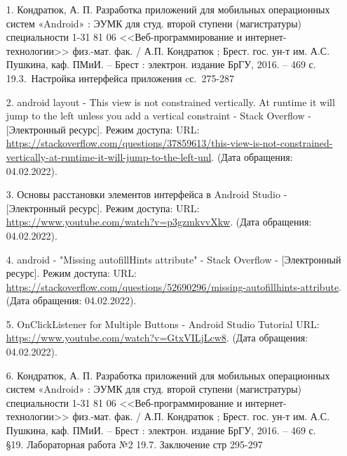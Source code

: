 \documentclass[12pt, a4paper, simple]{eskdtext}
\begin{document}
    \begin{enumerate}
        \item[1.] Кондратюк, А. П.
        Разработка приложений для мобильных операционных систем «Android» : ЭУМК для
        студ. второй ступени (магистратуры) специальности 1-31 81 06 <<Веб-программирование и интернет-технологии>>
        физ.-мат. фак. / А.П. Кондратюк ; Брест. гос. ун-т им. А.С. Пушкина, каф. ПМиИ. – Брест : электрон. издание БрГУ, 2016. – 469 с.\\
        19.3.~Настройка интерфейса приложения cс.~275-287

        \item[2.] android layout - This view is not constrained vertically. At runtime it will jump to the left unless you add a vertical constraint - Stack Overflow
        - [Электронный ресурс]. Режим доступа:
        URL: \url{https://stackoverflow.com/questions/37859613/this-view-is-not-constrained-vertically-at-runtime-it-will-jump-to-the-left-unl}.
        (Дата обращения: 04.02.2022).
        
        \item[3.] Основы расстановки элементов интерфейса в Android Studio
        - [Электронный ресурс]. Режим доступа:
        URL: \url{https://www.youtube.com/watch?v=p3gzmkvvXkw}.
        (Дата обращения: 04.02.2022).
        
        \item[4.] android - "Missing autofillHints attribute" - Stack Overflow
        - [Электронный ресурс]. Режим доступа:
        URL: \url{https://stackoverflow.com/questions/52690296/missing-autofillhints-attribute}.
        (Дата обращения: 04.02.2022).
        
        \item[5.] OnClickListener for Multiple Buttons - Android Studio Tutorial
        URL: \url{https://www.youtube.com/watch?v=GtxVILjLcw8}.
        (Дата обращения: 04.02.2022).
        
        \item[6.] Кондратюк, А. П.
        Разработка приложений для мобильных операционных систем «Android» : ЭУМК для
        студ. второй ступени (магистратуры) специальности 1-31 81 06 <<Веб-программирование и интернет-технологии>>
        физ.-мат. фак. / А.П. Кондратюк ; Брест. гос. ун-т им. А.С. Пушкина, каф. ПМиИ. – Брест : электрон. издание БрГУ, 2016. – 469 с.\\
        §19. Лабораторная работа №2 19.7. Заключение стр 295-297
    \end{enumerate}
\end{document}
